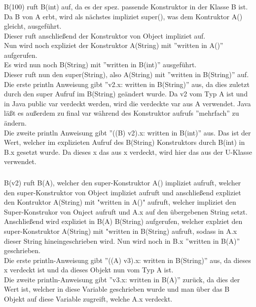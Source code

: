 \documentclass[12pt]{article}
\begin{document}
\subsubsection{}
\begin{center}
    B(100) ruft B(int) auf, da es der spez. passende Konstruktor in der Klasse B ist.\\
    Da B von A erbt, wird als nächstes impliziet super(), was dem Kontruktor A() gleicht, ausgeführt.\\
    Dieser ruft anschließend der Konstruktor von Object impliziet auf.\\
    Nun wird noch expliziet der Konstruktor A(String) mit ''written in A()'' aufgerufen.\\
    Es wird nun noch B(String) mit ''written in B(int)'' ausgeführt.\\
    Dieser ruft nun den super(String), also A(String) mit ''written in B(String)'' auf.\\
    Die erste println Anweisung gibt ''v2.x: written in B(String)'' aus, da dies zuletzt durch den super Aufruf im B(String) geändert wurde. Da v2 vom Typ A ist und in Java public var verdeckt werden, wird die verdeckte var aus A verwendet. Java läßt es außerdem zu final var während des Konstruktor aufrufs ''mehrfach'' zu ändern.\\
    Die zweite println Anweisung gibt ''((B) v2).x: written in B(int)'' aus. Das ist der Wert, welcher im explizieten Aufruf des B(String) Konstruktors durch B(int) in B.x gesetzt wurde. Da dieses x das aus x verdeckt, wird hier das aus der U-Klasse verwendet.
\end{center}

\subsubsection{}
\begin{center}
    B(v2) ruft B(A), welcher den super-Konstruktor A() impliziet aufruft, welcher den super-Konstruktor von Object impliziet aufruft und anschließend expliziet den Kontruktor A(String) mit "written in A()" aufruft, welcher impliziet den Super-Konstrukor von Onject aufruft und A.x auf den übergebenen String setzt.\\
    Anschließend wird expliziet in B(A) B(String) aufgerufen, welcher explziet den super-Konstruktor A(String) mit "written in B(String) aufruft, sodass in A.x dieser String hineingeschrieben wird. Nun wird noch in B.x ''written in B(A)'' geschrieben.\\
    Die erste println-Anweisung gibt ''((A) v3).x: written in B(String)'' aus, da dieses x verdeckt ist und da dieses Objekt nun vom Typ A ist.\\
    Die zweite println-Anweisung gibt ''v3.x: written in B(A)'' zurück, da dies der Wert ist, welcher in diese Variable geschrieben wurde und man über das B Objekt auf diese Variable zugreift, welche A.x verdeckt.
\end{center}
\pagebreak
\end{document}
